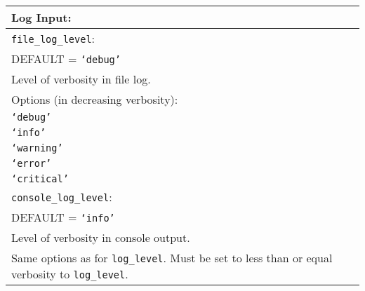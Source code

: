  \vspace{2em}
\begin{tabular}{|p{\textwidth}|}
\hline
\vspace{0.3em} \noindent \Large \textbf{Log Input:} \normalsize \\
\hline \vspace{0.1em} \texttt{file\_log\_level}: \\
DEFAULT = \texttt{`debug'} \\
Level of verbosity in file log. \\
Options (in decreasing verbosity): \\
 \hspace{0.5em} \texttt{`debug'} \\
 \hspace{0.5em} \texttt{`info'} \\
 \hspace{0.5em} \texttt{`warning'} \\
 \hspace{0.5em} \texttt{`error'} \\
 \hspace{0.5em} \texttt{`critical'} \\
\hline \vspace{0.1em} \texttt{console\_log\_level}: \\
DEFAULT = \texttt{`info'} \\
Level of verbosity in console output. \\
Same options as for \texttt{log\_level}. Must be set to less than or equal
verbosity to \texttt{log\_level}. \\
 
\hline
 \end{tabular} 
